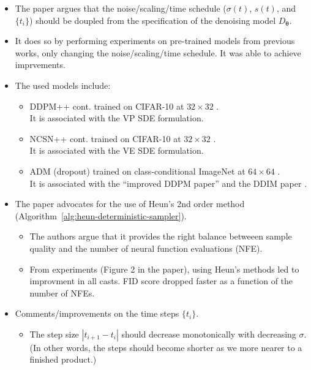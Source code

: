 \documentclass[10pt]{article}
\newcommand{\ves}[1]{\boldsymbol{#1}}
\begin{document}
\begin{itemize}
  \item The paper argues that the noise/scaling/time schedule ($\sigma(t)$, $s(t)$, and $\{ t_i\}$) should be doupled from the specification of the denoising model $D_{\ves{\theta}}$. 
  
  \item It does so by performing experiments on pre-trained models from previous works, only changing the noise/scaling/time schedule. It was able to achieve imprvements.
  
  \item The used models include:
  \begin{itemize}
    \item DDPM++ cont. trained on CIFAR-10 at $32 \times 32$ \cite{Song:2021}.\\
    It is associated with the VP SDE formulation.
    \item NCSN++ cont. trained on CIFAR-10 at $32 \times 32$ \cite{Song:2021}.\\
    It is associated with the VE SDE formulation.
    \item ADM (dropout) trained on class-conditional ImageNet at $64 \times 64$ \cite{Dhariwal:2021}.\\
    It is associated with the ``improved DDPM paper'' \cite{Dhariwal:2021} and the DDIM paper \cite{Song:DDIM:2020}.
  \end{itemize}

  \item The paper advocates for the use of Heun's 2nd order method (Algorithm~\ref{alg:heun-deterministic-sampler}).
  \begin{itemize}
    \item The authors argue that it provides the right balance betweeen sample quality and the number of neural function evaluations (NFE).
    \item From experiments (Figure 2 in the paper), using Heun's methods led to improvment in all casts. FID score dropped faster as a function of the number of NFEs.
  \end{itemize}

  \item Comments/improvements on the time steps $\{t_i\}$.
  \begin{itemize}
    \item The step size $|t_{i+1} - t_i|$ should decrease monotonically with decreasing $\sigma$. (In other words, the steps should become shorter as we more nearer to a finished product.)
    

\end{itemize}
\end{itemize}
\end{document}
